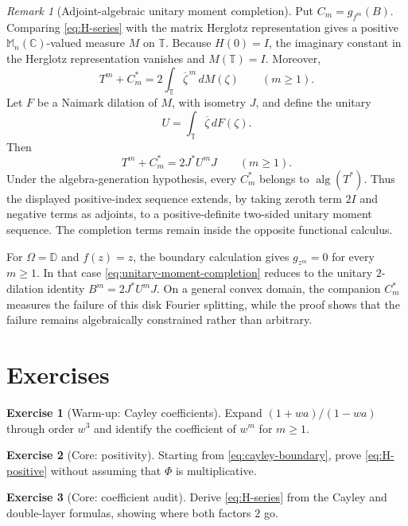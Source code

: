 \documentclass[11pt,oneside,openany]{book}
\theoremstyle{definition}
\newtheorem{exercise}{Exercise}[chapter]
\theoremstyle{remark}
\newtheorem{remark}[theorem]{Remark}
\newcommand{\C}{\mathbb C}
\newcommand{\D}{\mathbb D}
\newcommand{\Torus}{\mathbb T}
\newcommand{\Mn}{\mathbb M_n(\C)}
\newcommand{\alg}{\operatorname{alg}}
\begin{document}
\begin{remark}[Adjoint-algebraic unitary moment completion]
\label{rem:unitary-moment-completion}
Put \(C_m=g_{f^m}(B)\).  Comparing \eqref{eq:H-series} with the matrix
Herglotz representation gives a positive \(\Mn\)-valued measure \(M\)
on \(\Torus\).  Because \(H(0)=I\), the imaginary constant in the
Herglotz representation vanishes and \(M(\Torus)=I\).  Moreover,
\[
  T^m+C_m^*
  =
  2\int_{\Torus}\overline\zeta^{\,m}\,dM(\zeta)
  \qquad(m\geq1).
\]
Let \(F\) be a Naimark dilation of \(M\), with isometry \(J\), and
define the unitary
\[
  U=\int_{\Torus}\overline\zeta\,dF(\zeta).
\]
Then
\begin{equation}
  T^m+C_m^*=2J^*U^mJ
  \qquad(m\geq1).
  \label{eq:unitary-moment-completion}
\end{equation}
Under the algebra-generation hypothesis, every \(C_m^*\) belongs to
\(\alg(T^*)\).  Thus the displayed positive-index sequence extends,
by taking zeroth term \(2I\) and negative terms as adjoints, to a
positive-definite two-sided unitary moment sequence.  The completion
terms remain inside the opposite functional calculus.

For \(\Omega=\D\) and \(f(z)=z\), the boundary calculation gives
\(g_{z^m}=0\) for every \(m\geq1\).  In that case
\eqref{eq:unitary-moment-completion} reduces to the unitary
\(2\)-dilation identity \(B^m=2J^*U^mJ\).  On a general convex domain,
the companion \(C_m^*\) measures the failure of this disk
Fourier splitting, while the proof shows that the failure remains
algebraically constrained rather than arbitrary.
\end{remark}

\section{Exercises}

\begin{exercise}[Warm-up: Cayley coefficients]
Expand \((1+wa)/(1-wa)\) through order \(w^3\) and identify the
coefficient of \(w^m\) for \(m\geq1\).
\end{exercise}

\begin{exercise}[Core: positivity]
Starting from \eqref{eq:cayley-boundary}, prove
\eqref{eq:H-positive} without assuming that \(\Phi\) is multiplicative.
\end{exercise}

\begin{exercise}[Core: coefficient audit]
\label{ex:coefficient-audit}
Derive \eqref{eq:H-series} from the Cayley and double-layer formulas,
showing where both factors \(2\) go.
\end{exercise}
\end{document}
